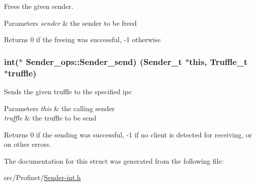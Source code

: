 Frees the given sender. 


\begin{DoxyParams}{Parameters}
{\em sender} & the sender to be freed\\
\hline
\end{DoxyParams}
\begin{DoxyReturn}{Returns}
0 if the freeing was successful, -\/1 otherwise 
\end{DoxyReturn}
\hypertarget{struct_sender__ops_a5adaf20efba44db11aedbe2c6c01d666}{}
\subsubsection[{Sender\+\_\+send}]{\setlength{\rightskip}{0pt plus 5cm}int($\ast$ Sender\+\_\+ops\+::\+Sender\+\_\+send) ({\bf Sender\+\_\+t} $\ast$this, {\bf Truffle\+\_\+t} $\ast$truffle)}\label{struct_sender__ops_a5adaf20efba44db11aedbe2c6c01d666}
Sends the given truffle to the specified ipc


\begin{DoxyParams}{Parameters}
{\em this} & the calling sender \\
\hline
{\em truffle} & the truffle to be send\\
\hline
\end{DoxyParams}
\begin{DoxyReturn}{Returns}
0 if the sending was successful, -\/1 if no client is detected for receiving, or on other errors. 
\end{DoxyReturn}


The documentation for this struct was generated from the following file\+:\begin{DoxyCompactItemize}
\item 
src/\+Profinet/\hyperlink{_sender-int_8h}{Sender-\/int.\+h}\end{DoxyCompactItemize}

